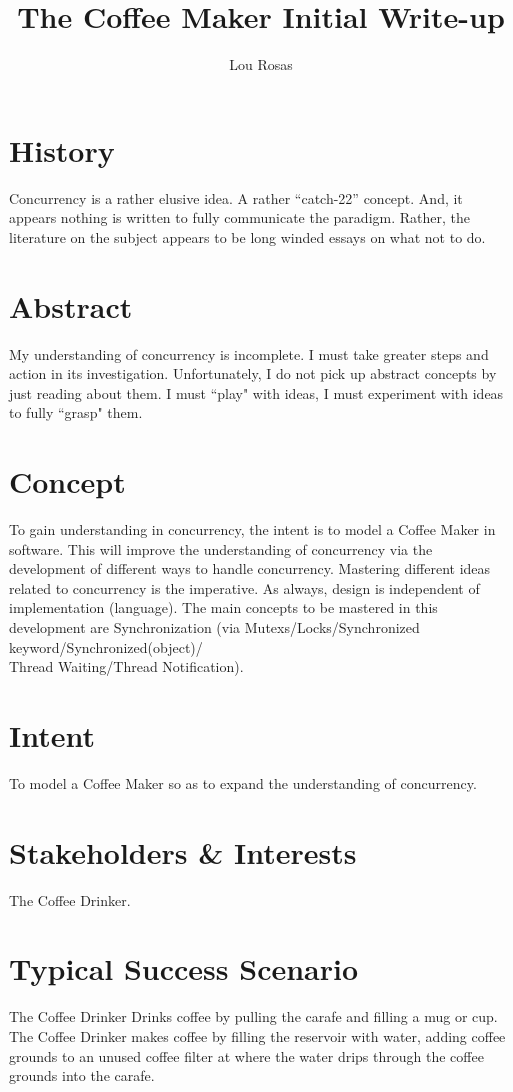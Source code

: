 \documentclass[letterpaper]{article}
\begin{document}
\title{The Coffee Maker Initial Write-up}
\author{Lou Rosas}
\maketitle

\section{History}
Concurrency is a rather elusive idea.  A rather “catch-22” concept.
And, it appears nothing is written to fully communicate the paradigm.
Rather, the literature on the subject appears to be long winded essays
on what not to do.
\section{Abstract}
My understanding of concurrency is incomplete.
I must take greater steps and action in its investigation.
Unfortunately, I do not pick up abstract concepts by just reading
about them.  I must ``play" with ideas, I must experiment with ideas
to fully ``grasp" them.
\section{Concept}
To gain understanding in concurrency, the intent is to model a Coffee
Maker in software.  This will improve the understanding of concurrency
via the development of different ways to handle concurrency.  
Mastering different ideas related to concurrency is the imperative.
As always, design is independent of implementation (language).  The
main concepts to be mastered in this development are Synchronization
(via Mutexs/Locks/Synchronized keyword/Synchronized(object)/\\Thread
Waiting/Thread Notification).
\section{Intent}
To model a Coffee Maker so as to expand the understanding of
concurrency.
\section{Stakeholders \& Interests}
The Coffee Drinker.
\section{Typical Success Scenario}
The Coffee Drinker Drinks coffee by pulling the carafe and filling a
mug or cup.\\
The Coffee Drinker makes coffee by filling the reservoir with water,
adding coffee grounds to an unused coffee filter at where the water
drips through the coffee grounds into the carafe.
\end{document}

